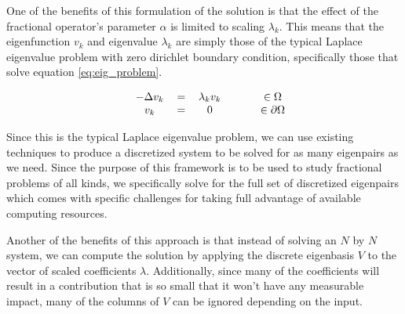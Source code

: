 One of the benefits of this formulation of the solution is that the effect of the fractional operator's parameter $\alpha$ is limited to scaling $\lambda_k$. This means that the eigenfunction $v_k$ and eigenvalue $\lambda_k$ are simply those of the typical Laplace eigenvalue problem with zero dirichlet boundary condition, specifically those that solve equation \eqref{eq:eig_problem}. 

\begin{equation}
\label{eq:eig_problem}
\begin{tabular}{ccccccc}
& $-\Delta v_k $ & = & $ \lambda_k v_k $ &  & & $\in \Omega$ \\
& $v_k$ & = & 0 &  &  & $ \in \partial \Omega$
\end{tabular} 
\end{equation}

Since this is the typical Laplace eigenvalue problem, we can use existing techniques to produce a discretized system to be solved for as many eigenpairs as we need. Since the purpose of this framework is to be used to study fractional problems of all kinds, we specifically solve for the full set of discretized eigenpairs which comes with specific challenges for taking full advantage of available computing resources.

Another of the benefits of this approach is that instead of solving an $N$ by $N$ system, we can compute the solution by applying the discrete eigenbasis $V$ to the vector of scaled coefficients $\lambda$. Additionally, since many of the coefficients will result in a contribution that is so small that it won't have any measurable impact, many of the columns of $V$ can be ignored depending on the input. 